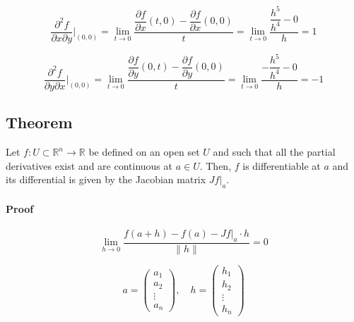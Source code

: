 \documentclass[11pt]{article}
\begin{document}
\[
\frac{\partial^2 f}{\partial x \partial y} \big|_{(0,0)} = \lim_{t \to 0} \dfrac{\dfrac{\partial f}{\partial x}(t,0) - \dfrac{\partial f}{\partial x}(0,0)}{t} = \lim_{t \to 0} \dfrac{\dfrac{h^5}{h^4} - 0}{h} = 1   
\]

\[
\frac{\partial^2 f}{\partial y \partial x} \big|_{(0,0)} = \lim_{t \to 0} \dfrac{\dfrac{\partial f}{\partial y}(0,t) - \dfrac{\partial f}{\partial y}(0,0)}{t} = \lim_{t \to 0} \dfrac{-\dfrac{h^5}{h^4} - 0}{h} = -1   
\]

\subsection{Theorem}
Let $f : U \subset \mathbb{R}^n \rightarrow \mathbb{R}$ be defined on an open set $U$ and such that all the partial derivatives exist and are continuous at $a \in U$. Then, $f$ is differentiable at $a$ and its differential is given by the Jacobian matrix $Jf \big|_a$.

\paragraph{Proof}
\[
\lim_{h \to 0} \frac{f(a + h) - f(a) - Jf \big|_a \cdot h}{\| h \|} = 0
\]

\[
a = \begin{pmatrix}
    a_1 \\
    a_2 \\
    \vdots \\
    a_n
\end{pmatrix}, \quad h = \begin{pmatrix}
    h_1 \\
    h_2 \\
    \vdots \\
    h_n
\end{pmatrix}
\]
\end{document}
